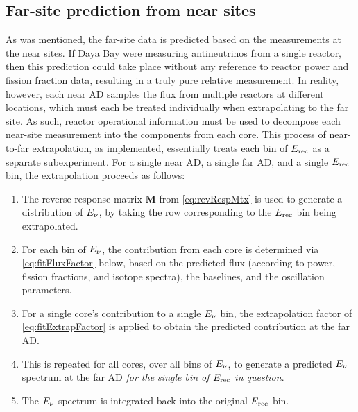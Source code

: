 \documentclass[../thesis.tex]{subfiles}
\begin{document}
\begin{comment}
Compared to the toy Monte Carlo, the LBNL shape fitter is a relatively simple thing.

Its job is just to find the oscillation parameters that best fit the data, i.e. that give the lowest chi2.

It also produces a map of chi2 in parameter space for derivation of contours.
\end{comment}

\subsection{Far-site prediction from near sites}
\label{sec:fitNearToFarPred}

As was mentioned, the far-site data is predicted based on the measurements at the near sites. If Daya Bay were measuring antineutrinos from a single reactor, then this prediction could take place without any reference to reactor power and fission fraction data, resulting in a truly pure relative measurement. In reality, however, each near AD samples the flux from multiple reactors at different locations, which must each be treated individually when extrapolating to the far site. As such, reactor operational information must be used to decompose each near-site measurement into the components from each core. This process of near-to-far extrapolation, as implemented, essentially treats each bin of $E_\mathrm{rec}$ as a separate subexperiment. For a single near AD, a single far AD, and a single $E_\mathrm{rec}$ bin, the extrapolation proceeds as follows:

\begin{enumerate}
\item The reverse response matrix $\mathbf{M}$ from \autoref{eq:revRespMtx} is used to generate a distribution of $E_\mathrm{\nu}$, by taking the row corresponding to the $E_\mathrm{rec}$ bin being extrapolated.
\item For each bin of $E_\mathrm{\nu}$, the contribution from each core is determined via \autoref{eq:fitFluxFactor} below, based on the predicted flux (according to power, fission fractions, and isotope spectra), the baselines, and the oscillation parameters.
\item For a single core's contribution to a single $E_\mathrm{\nu}$ bin, the extrapolation factor of \autoref{eq:fitExtrapFactor} is applied to obtain the predicted contribution at the far AD.
\item This is repeated for all cores, over all bins of $E_\mathrm{\nu}$, to generate a predicted $E_\mathrm{\nu}$ spectrum at the far AD \emph{for the single bin of $E_\mathrm{rec}$ in question}.
\item The $E_\mathrm{\nu}$ spectrum is integrated back into the original $E_\mathrm{rec}$ bin.
\end{enumerate}
\end{document}

